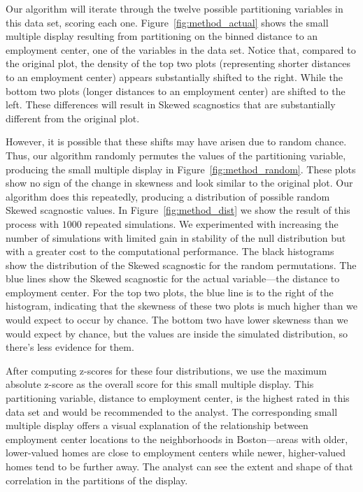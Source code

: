Our algorithm will iterate through the twelve possible partitioning variables in this data set, scoring each one. Figure~\ref{fig:method_actual} shows the small multiple display resulting from partitioning on the binned distance to an employment center, one of the variables in the data set. Notice that, compared to the original plot, the density of the top two plots (representing shorter distances to an employment center) appears substantially shifted to the right. While the bottom two plots (longer distances to an employment center) are shifted to the left. These differences will result in Skewed scagnostics that are substantially different from the original plot. 

However, it is possible that these shifts may have arisen due to random chance. Thus, our algorithm randomly permutes the values of the partitioning variable, producing the small multiple display in Figure~\ref{fig:method_random}. These plots show no sign of the change in skewness and look similar to the original plot. 
Our algorithm does this repeatedly, producing a distribution of possible random Skewed scagnostic values. In Figure~\ref{fig:method_dist} we show the result of this process with $1000$ repeated simulations. We experimented with increasing the number of simulations with limited gain in stability of the null distribution but with a greater cost to the computational performance. The black histograms show the distribution of the Skewed scagnostic for the random permutations. The blue lines show the Skewed scagnostic for the actual variable---the distance to employment center. For the top two plots, the blue line is to the right of the histogram, indicating that the skewness of these two plots is much higher than we would expect to occur by chance. The bottom two have lower skewness than we would expect by chance, but the values are inside the simulated distribution, so there's less evidence for them.

After computing z-scores for these four distributions, we use the maximum absolute z-score as the overall score for this small multiple display. This partitioning variable, distance to employment center, is the highest rated in this data set and would be recommended to the analyst. The corresponding small multiple display offers a visual explanation of the relationship between employment center locations to the neighborhoods in Boston---areas with older, lower-valued homes are close to employment centers while newer, higher-valued homes tend to be further away. The analyst can see the extent and shape of that correlation in the partitions of the display.
